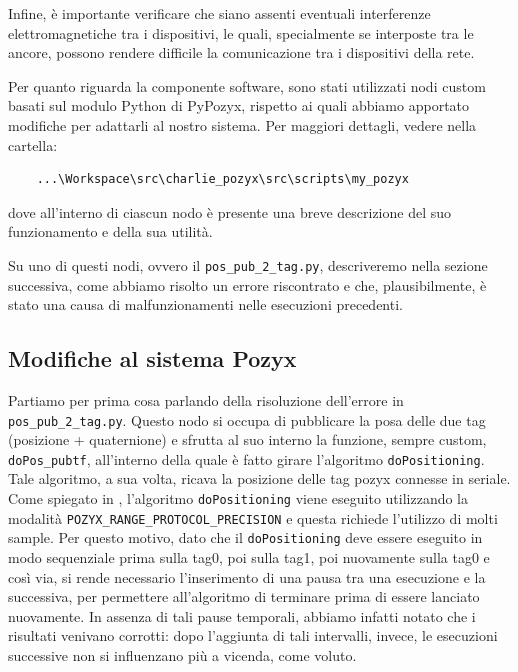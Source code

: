 Infine, è importante verificare che siano assenti eventuali interferenze elettromagnetiche tra i dispositivi, le quali, specialmente se interposte tra le ancore, 
possono rendere difficile la comunicazione tra i dispositivi della rete.

Per quanto riguarda la componente software, sono stati utilizzati nodi custom basati sul modulo Python di PyPozyx, rispetto ai quali abbiamo apportato modifiche 
per adattarli al nostro sistema. Per maggiori dettagli, vedere nella cartella:
\begin{verbatim}
	...\Workspace\src\charlie_pozyx\src\scripts\my_pozyx 
\end{verbatim}
dove all'interno di ciascun nodo è presente una breve descrizione del suo funzionamento e della sua utilità.

\vspace{0.5 cm}
Su uno di questi nodi, ovvero il \verb|pos_pub_2_tag.py|, descriveremo nella sezione successiva, come abbiamo risolto un errore riscontrato e che, plausibilmente, è stato una causa
di malfunzionamenti nelle esecuzioni precedenti. 

\subsection{Modifiche al sistema Pozyx}
\label{sez:Modifiche Pozyx}

Partiamo per prima cosa parlando della risoluzione dell'errore in \verb|pos_pub_2_tag.py|. Questo nodo si occupa di pubblicare la posa delle due tag (posizione + quaternione) e sfrutta al suo interno 
la funzione, sempre custom, \verb|doPos_pubtf|, all'interno della quale è fatto girare l'algoritmo \verb|doPositioning|. Tale algoritmo, a sua volta, ricava la posizione
delle tag pozyx connesse in seriale. Come spiegato in \cite{ctesconistudio}, l'algoritmo \verb|doPositioning| viene eseguito utilizzando la modalità 
\verb|POZYX_RANGE_PROTOCOL_PRECISION| e questa richiede l'utilizzo di molti sample. Per questo motivo, dato che il \verb|doPositioning| deve essere eseguito 
in modo sequenziale prima sulla tag0, poi sulla tag1, poi nuovamente sulla tag0 e così via, si rende necessario l'inserimento di una pausa tra una esecuzione 
e la successiva, per permettere all'algoritmo di terminare prima di essere lanciato nuovamente. In assenza di tali pause temporali, abbiamo infatti notato che 
i risultati venivano corrotti: dopo l'aggiunta di tali intervalli, invece, le esecuzioni successive non si influenzano più a vicenda, come voluto.

